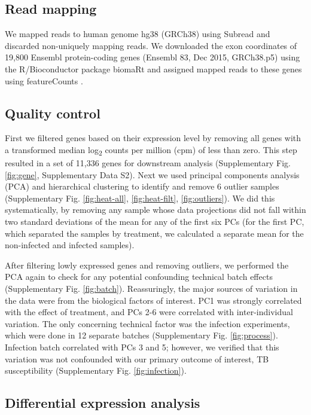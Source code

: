 \documentclass[fleqn,10pt]{wlscirep}
\begin{document}
\subsection*{Read mapping}

We mapped reads to human genome hg38 (GRCh38) using Subread
\cite{Liao2013} and discarded non-uniquely mapping reads. We
downloaded the exon coordinates of 19,800 Ensembl \cite{Yates2016}
protein-coding genes (Ensembl 83, Dec 2015, GRCh38.p5) using the
R/Bioconductor \cite{Huber2015} package biomaRt \cite{Durinck2005,
Durinck2009} and assigned mapped reads to these genes using
featureCounts \cite{Liao2014}.
\subsection*{Quality control}

First we filtered genes based on their expression level by removing
all genes with a transformed median log\textsubscript{2} counts per
million (cpm) of less than zero. This step resulted in a set of 11,336
genes for downstream analysis (Supplementary Fig. \ref{fig:gene},
Supplementary Data S2). Next we used principal components analysis
(PCA) and hierarchical clustering to identify and remove 6 outlier
samples (Supplementary Fig. \ref{fig:heat-all}, \ref{fig:heat-filt},
\ref{fig:outliers}). We did this systematically, by removing any
sample whose data projections did not fall within two standard
deviations of the mean for any of the first six PCs (for the first PC,
which separated the samples by treatment, we calculated a separate
mean for the non-infected and infected samples).

After filtering lowly expressed genes and removing outliers, we
performed the PCA again to check for any potential confounding
technical batch effects (Supplementary Fig. \ref{fig:batch}).
Reassuringly, the major sources of variation in the data were from the
biological factors of interest. PC1 was strongly correlated with the
effect of treatment, and PCs 2-6 were correlated with inter-individual
variation. The only concerning technical factor was the infection
experiments, which were done in 12 separate batches (Supplementary
Fig. \ref{fig:process}). Infection batch correlated with PCs 3 and 5;
however, we verified that this variation was not confounded with our
primary outcome of interest, TB susceptibility (Supplementary Fig.
\ref{fig:infection}).
\subsection*{Differential expression analysis}
\end{document}
